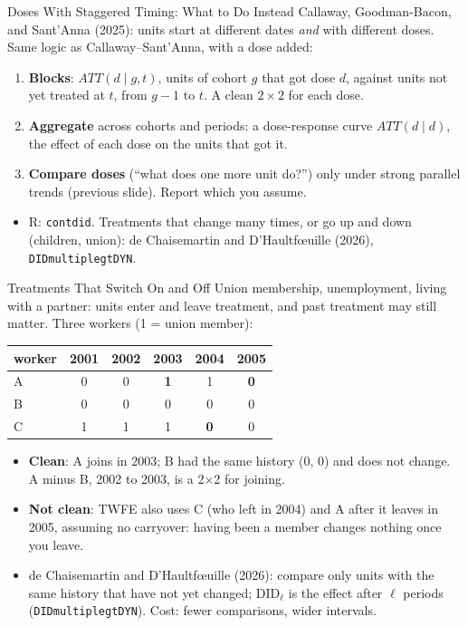 \documentclass[aspectratio=169,11pt,xcolor=dvipsnames]{beamer}
\newcommand{\srct}[1]{#1}
\begin{document}
\begin{frame}{Doses With Staggered Timing: What to Do Instead}
\srct{Callaway, Goodman-Bacon, and Sant'Anna (2025)}: units start at different dates
\emph{and} with different doses. Same logic as Callaway--Sant'Anna, with a dose added:
\vskip3pt
\begin{enumerate}\itemsep3pt
  \item \textbf{Blocks}: $ATT(d \mid g, t)$, units of cohort $g$ that got dose $d$, against units not
        yet treated at $t$, from $g-1$ to $t$. A clean $2\times2$ for each dose.
  \item \textbf{Aggregate} across cohorts and periods: a dose-response curve $ATT(d \mid d)$,
        the effect of each dose on the units that got it.
  \item \textbf{Compare doses} (``what does one more unit do?'') only under strong parallel
        trends (previous slide). Report which you assume.
\end{enumerate}
\vskip4pt
\begin{itemize}\itemsep2pt
  \item R: \texttt{contdid}. Treatments that change many times, or go up and down (children,
        union): \srct{de Chaisemartin and D'Haultf\oe uille (2026)}, \texttt{DIDmultiplegtDYN}.
\end{itemize}
\end{frame}

\begin{frame}{Treatments That Switch On and Off}
Union membership, unemployment, living with a partner: units enter and leave treatment, and
past treatment may still matter. Three workers (1 = union member):
\begin{center}\small
\renewcommand{\arraystretch}{1.15}
\begin{tabular}{@{}lccccc@{}}
\toprule
worker & 2001 & 2002 & 2003 & 2004 & 2005 \\
\midrule
A & 0 & 0 & \textbf{1} & 1 & \textbf{0} \\
B & 0 & 0 & 0 & 0 & 0 \\
C & 1 & 1 & 1 & \textbf{0} & 0 \\
\bottomrule
\end{tabular}
\end{center}
\begin{itemize}\itemsep3pt
  \item \textbf{Clean}: A joins in 2003; B had the same history (0, 0) and does not change.
        A minus B, 2002 to 2003, is a 2$\times$2 for joining.
  \item \textbf{Not clean}: TWFE also uses C (who left in 2004) and A after it leaves in 2005,
        assuming no carryover: having been a member changes nothing once you leave.
  \item \srct{de Chaisemartin and D'Haultf\oe uille (2026)}: compare only units with the same
        history that have not yet changed; $\text{DID}_\ell$ is the effect after $\ell$ periods
        (\texttt{DIDmultiplegtDYN}). Cost: fewer comparisons, wider intervals.
\end{itemize}
\end{frame}
\end{document}
